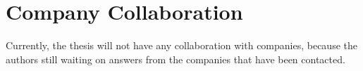 \section{Company Collaboration}
Currently, the thesis will not have any collaboration with companies, because the authors still waiting on answers from the companies that have been contacted.  